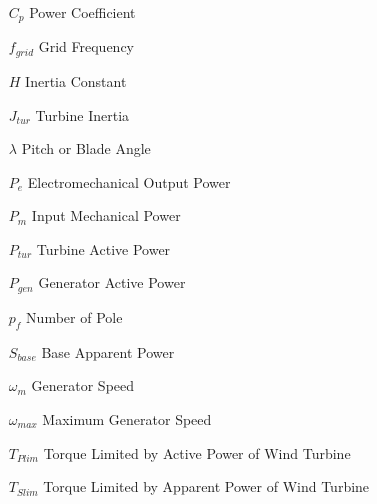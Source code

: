 
\begin{theglossary}{}
	
	\begin{itemize}[leftmargin=4.5em,align=parleft,labelsep=1cm]
		
		\item[$C_{p}$] 			Power Coefficient
		\item[$f_{grid}$] 		Grid Frequency
		\item[$H$] 				Inertia Constant
		\item[$J_{tur}$] 		Turbine Inertia
		\item[$\lambda$] 		Pitch or Blade Angle
		\item[$P_{e}$] 			Electromechanical Output Power
		\item[$P_{m}$] 			Input Mechanical Power
		\item[$P_{tur}$] 		Turbine Active Power
		\item[$P_{gen}$] 		Generator Active Power
		\item[$p_{f}$] 			Number of Pole
		\item[$S_{base}$] 		Base Apparent Power
		\item[$\omega_{m}$] 	Generator Speed
		\item[$\omega_{max}$] 	Maximum Generator Speed
		\item[$T_{Plim}$]		Torque Limited by Active Power of Wind Turbine
		\item[$T_{Slim}$] 		Torque Limited by Apparent Power of Wind Turbine
		
		
	\end{itemize}
	
\end{theglossary}